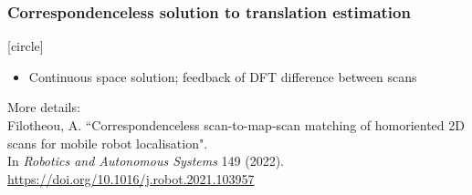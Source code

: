 \begin{frame}[noframenumbering]

  \frametitle{Correspondenceless solution to translation estimation}

  \vspace{0.1cm}
  [circle]
  \begin{itemize}
    \item Continuous space solution; feedback of DFT difference between scans
  \end{itemize}
  \vspace{-0.5cm}

  \begin{center}
  \end{center}

  \vfill
  {\tiny
  More details: \\
  Filotheou, A. ``Correspondenceless scan-to-map-scan matching of homoriented 2D scans for mobile robot localisation". \\\vspace{-0.25cm}
  In \textit{Robotics and Autonomous Systems} 149 (2022). \url{https://doi.org/10.1016/j.robot.2021.103957}}

\end{frame}
